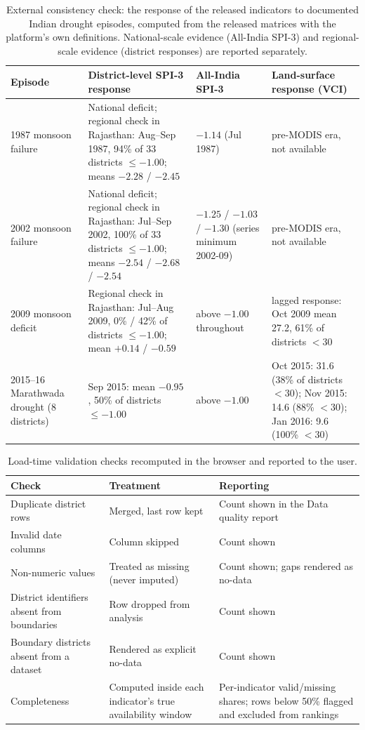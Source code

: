 \documentclass[10pt,a4paper]{article}
\begin{document}
\begin{table}[t]
\caption{External consistency check: the response of the released indicators to documented Indian drought episodes, computed from the released matrices with the platform's own definitions. National-scale evidence (All-India SPI-3) and regional-scale evidence (district responses) are reported separately.}
\label{tab:known}
\small
\begin{tabularx}{\textwidth}{@{}p{}p{}p{}X@{}}
\toprule
Episode & District-level SPI-3 response & All-India SPI-3 & Land-surface response (VCI) \\
\midrule
1987 monsoon failure & National deficit; regional check in Rajasthan: Aug--Sep 1987, 94\% of 33 districts $\le -1.00$; means $-2.28$ / $-2.45$ & $-1.14$ (Jul 1987) & pre-MODIS era, not available \\
2002 monsoon failure & National deficit; regional check in Rajasthan: Jul--Sep 2002, 100\% of 33 districts $\le -1.00$; means $-2.54$ / $-2.68$ / $-2.54$ & $-1.25$ / $-1.03$ / $-1.30$ (series minimum 2002-09) & pre-MODIS era, not available \\
2009 monsoon deficit & Regional check in Rajasthan: Jul--Aug 2009, 0\% / 42\% of districts $\le -1.00$; mean $+0.14$ / $-0.59$ & above $-1.00$ throughout & lagged response: Oct 2009 mean 27.2, 61\% of districts $<30$ \\
2015--16 Marathwada drought (8 districts) & Sep 2015: mean $-0.95$, 50\% of districts $\le -1.00$ & above $-1.00$ & Oct 2015: 31.6 (38\% of districts $<30$); Nov 2015: 14.6 (88\% $<30$); Jan 2016: 9.6 (100\% $<30$) \\
\bottomrule
\end{tabularx}
\end{table}

\begin{table}[t]
\caption{Load-time validation checks recomputed in the browser and reported to the user.}
\label{tab:loadchecks}
\small
\begin{tabularx}{\textwidth}{@{}p{}p{}X@{}}
\toprule
Check & Treatment & Reporting \\
\midrule
Duplicate district rows & Merged, last row kept & Count shown in the Data quality report \\
Invalid date columns & Column skipped & Count shown \\
Non-numeric values & Treated as missing (never imputed) & Count shown; gaps rendered as no-data \\
District identifiers absent from boundaries & Row dropped from analysis & Count shown \\
Boundary districts absent from a dataset & Rendered as explicit no-data & Count shown \\
Completeness & Computed inside each indicator's true availability window & Per-indicator valid/missing shares; rows below 50\% flagged and excluded from rankings \\
\bottomrule
\end{tabularx}
\end{table}
\end{document}
